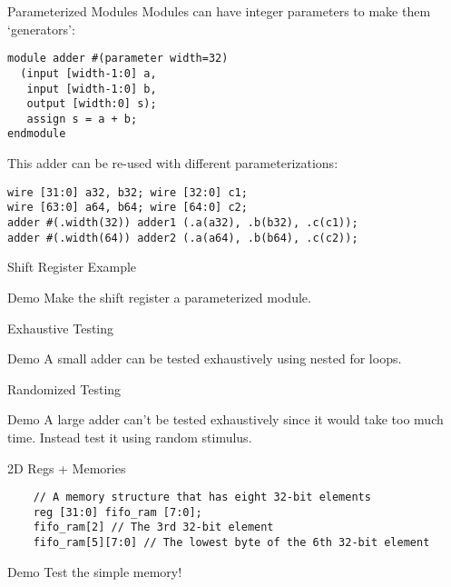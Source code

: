 \documentclass[12pt,aspectratio=169]{beamer}
\begin{document}
\begin{frame}[fragile]{Parameterized Modules}
  Modules can have integer parameters to make them `generators':
  \begin{verbatim}
module adder #(parameter width=32)
  (input [width-1:0] a,
   input [width-1:0] b,
   output [width:0] s);
   assign s = a + b;
endmodule
  \end{verbatim}

  This adder can be re-used with different parameterizations:
  \begin{verbatim}
wire [31:0] a32, b32; wire [32:0] c1;
wire [63:0] a64, b64; wire [64:0] c2;
adder #(.width(32)) adder1 (.a(a32), .b(b32), .c(c1));
adder #(.width(64)) adder2 (.a(a64), .b(b64), .c(c2));
  \end{verbatim}
\end{frame}

\begin{frame}[fragile]{Shift Register Example}
  \begin{block}{Demo}
    Make the shift register a parameterized module.
  \end{block}
\end{frame}

\begin{frame}{Exhaustive Testing}
  \begin{block}{Demo}
    A small adder can be tested exhaustively using nested for loops.
  \end{block}
\end{frame}

\begin{frame}{Randomized Testing}
  \begin{block}{Demo}
    A large adder can't be tested exhaustively since it would take too much time. Instead test it using random stimulus.
  \end{block}
\end{frame}

\begin{frame}[fragile]{2D Regs + Memories}
  \begin{verbatim}
    // A memory structure that has eight 32-bit elements
    reg [31:0] fifo_ram [7:0];
    fifo_ram[2] // The 3rd 32-bit element
    fifo_ram[5][7:0] // The lowest byte of the 6th 32-bit element
  \end{verbatim}

  \begin{block}{Demo}
    Test the simple memory!
  \end{block}
\end{frame}
\end{document}
